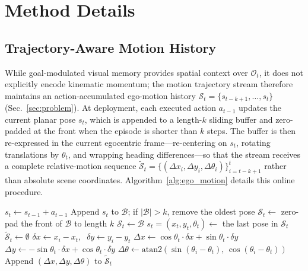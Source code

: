 \documentclass{article}
\begin{document}
\section{Method Details}
\label{appendix:method_details}

\subsection{Trajectory-Aware Motion History}
\label{appendix:ego_history_conversion}

While goal-modulated visual memory provides spatial context over $\mathcal{O}_t$, it does not explicitly encode kinematic momentum; the motion trajectory stream therefore maintains an action-accumulated ego-motion history $\mathcal{S}_t=\{s_{t-k+1}, \ldots, s_t\}$ (Sec.~\ref{sec:problem}). At deployment, each executed action $a_{t-1}$ updates the current planar pose $s_t$, which is appended to a length-$k$ sliding buffer and zero-padded at the front when the episode is shorter than $k$ steps. The buffer is then re-expressed in the current egocentric frame---re-centering on $s_t$, rotating translations by $\theta_t$, and wrapping heading differences---so that the stream receives a complete relative-motion sequence $\tilde{\mathcal{S}}_t=\{(\Delta x_i,\Delta y_i,\Delta\theta_i)\}_{i=t-k+1}^{t}$ rather than absolute scene coordinates. Algorithm~\ref{alg:ego_motion} details this online procedure.

\begin{algorithm}[h]
\caption{Online Ego-Motion History and Egocentric Conversion}
\begin{algorithmic}
\STATE $s_t \leftarrow s_{t-1} + a_{t-1}$
\STATE Append $s_t$ to $\mathcal{B}$; if $|\mathcal{B}|>k$, remove the oldest pose
    \STATE $\mathcal{S}_t \leftarrow$ zero-pad the front of $\mathcal{B}$ to length $k$
\ELSE
    \STATE $\mathcal{S}_t \leftarrow \mathcal{B}$
\ENDIF
\STATE $s_t=(x_t,y_t,\theta_t) \leftarrow$ the last pose in $\mathcal{S}_t$
\STATE $\tilde{\mathcal{S}}_t \leftarrow \emptyset$
    \STATE $\delta x \leftarrow x_i - x_t,\;\; \delta y \leftarrow y_i - y_t$
    \STATE $\Delta x \leftarrow \cos\theta_t \cdot \delta x + \sin\theta_t \cdot \delta y$
    \STATE $\Delta y \leftarrow -\sin\theta_t \cdot \delta x + \cos\theta_t \cdot \delta y$
    \STATE $\Delta\theta \leftarrow \mathrm{atan2}(\sin(\theta_i-\theta_t),\,\cos(\theta_i-\theta_t))$
    \STATE Append $(\Delta x,\Delta y,\Delta\theta)$ to $\tilde{\mathcal{S}}_t$
\ENDFOR
\end{algorithmic}
\label{alg:ego_motion}
\end{algorithm}
\end{document}
